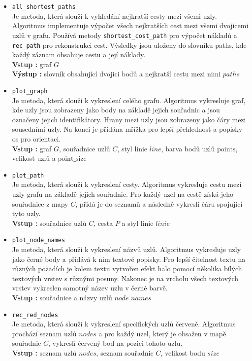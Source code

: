 \begin{itemize}
    \item \texttt{all\_shortest\_paths}\\
    Je metoda, která slouží k vyhledání nejkratší cesty mezi všemi uzly. Algoritmus implementuje výpočet všech nejkratších cest mezi všemi dvojicemi uzlů v grafu. Používá metody \texttt{shortest\_cost\_path} pro výpočet nákladů a \texttt{rec\_path} pro rekonstrukci cest. Výsledky jsou uloženy do slovníku paths, kde každý záznam obsahuje cestu a její náklady.\\
    \textbf{Vstup : } graf $G$\\
    \textbf{Výstup : } slovník obsahující dvojici bodů a nejkratší cestu mezi nimi $paths$
    
    \item \texttt{plot\_graph}\\
    Je metoda, která slouží k vykreslení celého grafu. Algoritmus vykresluje graf, kde uzly jsou zobrazeny jako body na základě jejich souřadnic a jsou označeny jejich identifikátory. Hrany mezi uzly jsou zobrazeny jako čáry mezi sousedními uzly. Na konci je přidána mřížka pro lepší přehlednost a popisky os pro orientaci.\\
    \textbf{Vstup : } graf $G$, souřadnice uzlů $C$, styl linie $line$, barva bodů uzlů $\text{points}$, velikost uzlů a $\text{point\_size}$
    
    \item \texttt{plot\_path}\\
    Je metoda, která slouží k vykreslení cesty. Algoritmus vykresluje cestu mezi uzly grafu na základě jejich souřadnic. Pro každý uzel na cestě získá jeho souřadnice z mapy $C$, přidá je do seznamů a následně vykreslí čáru spojující tyto uzly.\\
    \textbf{Vstup : } souřadnice uzlů $C$, cesta $P$ a styl linie $linie$
    
    \item \texttt{plot\_node\_names}\\
    Je metoda, která slouží k vykreslení názvů uzlů. Algoritmus vykresluje uzly jako černé body a přidává k nim textové popisky. Pro lepší čitelnost textu na různých pozadích je kolem textu vytvořen efekt halo pomocí několika bílých textových vrstev s různými posuny. Nakonec je na vrcholu všech textových vrstev vykreslen samotný název uzlu v černé barvě.\\
    \textbf{Vstup : } souřadnice a názvy uzlů $node\_names$
    
    \item \texttt{rec\_red\_nodes}\\
    Je metoda, která slouží k vykreslení specifických uzlů červeně. Algoritmus prochází seznam uzlů $nodes$ a pro každý uzel, který je obsažen v mapě souřadnic $C$, vykreslí červený bod na pozici tohoto uzlu.\\
    \textbf{Vstup : } seznam uzlů $nodes$, seznam souřadnic $C$, velikost bodu $size$
    

\end{itemize}
